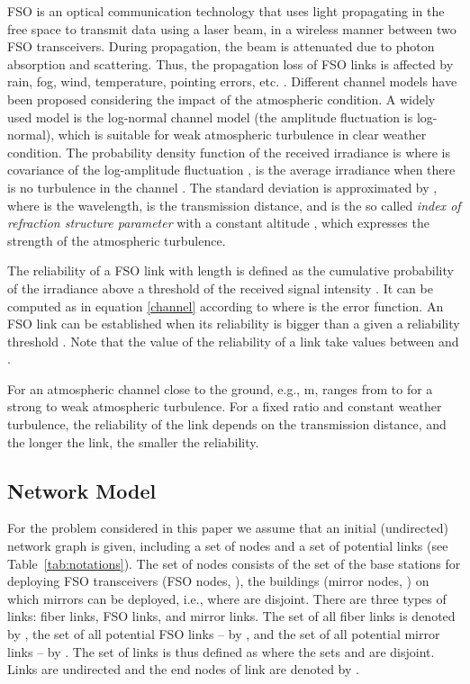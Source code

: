 \documentclass[onecolumn,11pt,draftclsnofoot]{IEEEtran}
\begin{document}
FSO is an optical communication technology that uses light propagating in the free space to transmit data using a laser beam, in a wireless manner between two FSO transceivers. During propagation, the beam is attenuated due to photon absorption and scattering. Thus, the propagation loss of FSO links is affected by rain, fog, wind, temperature, pointing errors, etc. \cite{Ghassemlooy2012}. Different channel models have been proposed considering the impact of the atmospheric condition. A widely used model is the log-normal channel model (the amplitude fluctuation is log-normal), which is suitable for weak atmospheric turbulence in clear weather condition. The probability density function of the received irradiance  is  where  is covariance of the log-amplitude fluctuation ,  is the average irradiance when there is no turbulence in the channel \cite{Zhu2002}. The standard deviation  is approximated by , where  is the wavelength,  is the transmission distance, and  is the so called \emph{index of refraction structure parameter} with a constant altitude , which expresses the strength of the atmospheric turbulence.

The reliability of a FSO link with length  is defined as the cumulative probability of the irradiance above a threshold of the received signal intensity . It can be computed as in equation \eqref{channel} according to \cite{Son2010} where  is the error function. An FSO link can be established when its reliability is bigger than a given a reliability threshold . Note that the value of the reliability of a link take values between  and .


For an atmospheric channel close to the ground, e.g.,  m,   ranges from  to   for a strong to weak atmospheric turbulence. For a fixed ratio  and constant weather turbulence, the reliability of the link depends on the transmission distance, and the longer the link, the smaller the reliability.

\subsection{Network Model}
For the problem considered in this paper we assume that an initial (undirected) network graph is given, including a set of nodes  and a set of potential links  (see Table~\ref{tab:notations}).
The set of nodes consists of the set of the base stations for deploying FSO transceivers (FSO nodes, ), the buildings (mirror nodes, ) on which mirrors can be deployed, i.e.,  where  are disjoint. There are three types of links: fiber links, FSO links, and mirror links. The set of all fiber links is denoted by , the set of all potential FSO links -- by , and the set of all potential mirror links -- by . The set of links is thus defined as  where the sets  and  are disjoint. Links are undirected and the end nodes of link  are denoted by .
\end{document}
